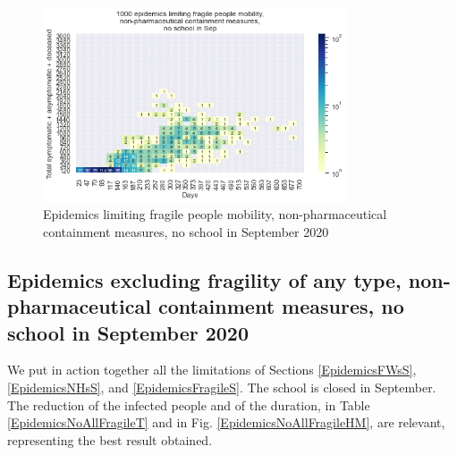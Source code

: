 \documentclass[11pt]{article}
\begin{document}
\begin{figure}[H]
\begin{center}
\includegraphics[width=0.8\textwidth]{HM30_readRunResults1k_with_Frag_at20_plusHMlog.png}
\caption{Epidemics limiting fragile people mobility, non-pharmaceutical containment measures, no school in September 2020}
\label{EpidemicsFragileHM}
\end{center}
\end{figure}


\subsection{Epidemics excluding fragility of any type, non-pharmaceutical containment measures, no school in September 2020}
\label{EpidemicsNoAllFragileS}

We put in action together all the limitations of Sections \ref{EpidemicsFWsS}, \ref{EpidemicsNHsS}, and \ref{EpidemicsFragileS}. The school is closed in September. The reduction of the infected people and of the duration, in Table \ref{EpidemicsNoAllFragileT} and in Fig. \ref{EpidemicsNoAllFragileHM}, are relevant, representing the best result obtained.
\end{document}
